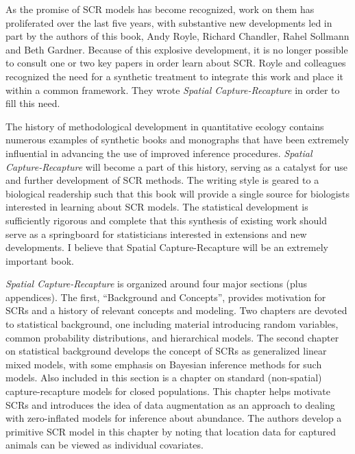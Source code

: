 As the promise of SCR models has become
recognized, work on them has proliferated over the last five years,
with substantive new developments led in part by the authors of this
book, Andy Royle, Richard Chandler, Rahel Sollmann and Beth
Gardner. Because of this explosive development, it is no longer
possible to consult one or two key papers in order learn about
SCR. Royle and colleagues recognized the need for a synthetic
treatment to integrate this work and place it within a common
framework. They wrote {\it Spatial Capture-Recapture} in order to fill this
need.  

The history of methodological development in quantitative
ecology contains numerous examples of synthetic books and monographs
that have been extremely influential in advancing the use of improved
inference procedures. {\it Spatial Capture-Recapture} will become a part of
this history, serving as a catalyst for use and further development of
SCR methods. The writing style is geared to a biological readership
such that this book will provide a single source for biologists
interested in learning about SCR models. The statistical development
is sufficiently rigorous and complete that this synthesis of existing
work should serve as a springboard for statisticians interested in
extensions and new developments. I believe that Spatial
Capture-Recapture will be an extremely important book.  

{\it Spatial
Capture-Recapture} is organized around four major sections (plus
appendices). The first, ``Background and Concepts'', provides motivation
for SCRs and a history of relevant concepts and modeling. Two chapters
are devoted to statistical background, one including material
introducing random variables, common probability distributions, and
hierarchical models. The second chapter on statistical background
develops the concept of SCRs as generalized linear mixed models, with
some emphasis on Bayesian inference methods for such models. Also
included in this section is a chapter on standard (non-spatial)
capture-recapture models for closed populations. This chapter helps
motivate SCRs and introduces the idea of data augmentation as an
approach to dealing with zero-inflated models for inference about
abundance. The authors develop a primitive SCR model in this chapter
by noting that location data for captured animals can be viewed as
individual covariates.  


